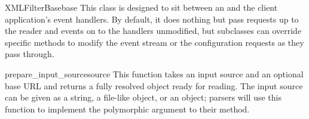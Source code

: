 \begin{classdesc}{XMLFilterBase}{base}
  This class is designed to sit between an  and the
  client application's event handlers.  By default, it does nothing
  but pass requests up to the reader and events on to the handlers
  unmodified, but subclasses can override specific methods to modify
  the event stream or the configuration requests as they pass through.
\end{classdesc}

\begin{funcdesc}{prepare_input_source}{source}
  This function takes an input source and an optional base URL and
  returns a fully resolved  object ready for
  reading.  The input source can be given as a string, a file-like
  object, or an  object; parsers will use this
  function to implement the polymorphic  argument to their
   method.
\end{funcdesc}
